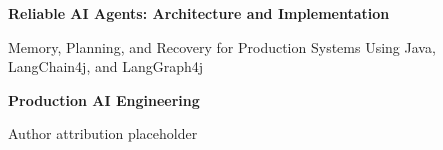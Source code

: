 \begin{titlepage}
  \centering
  \vspace*{0.16\textheight}
  {\Huge\bfseries Reliable AI Agents: Architecture and Implementation\par}
  \vspace{1.5em}
  {\Large Memory, Planning, and Recovery for Production Systems Using Java, LangChain4j, and LangGraph4j\par}
  \vspace{1.5em}
  {\large\bfseries Production AI Engineering\par}
  \vfill
  {\large Author attribution placeholder\par}
  \vspace*{0.12\textheight}
\end{titlepage}
